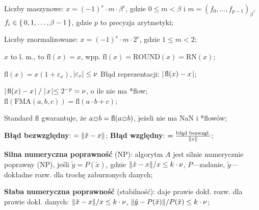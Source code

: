 
\entry
Liczby maszynowe: $x=(-1)^s \cdot m \cdot \beta^e$, gdzie $0\leq m < \beta$ i $m=(f_0, \ldots, f_{p-1})_\beta$, $f_i\in\set{0,1,\ldots,\beta-1}$, gdzie $p$ to precyzja arytmetyki;

\entry
Liczby znormalizowane: $x=(-1)^s\cdot m \cdot 2^e$, gdzie $1\leq m < 2$;

\entry
$x$ to l. m.,
to $\mathrm{fl}(x)=x$,
wpp. $\mathrm{fl}(x)=\mathrm{ROUND}(x)=\mathrm{RN}(x)$;

\entry
$\mathrm{fl}(x) = x(1+\varepsilon_x)$, $\abs{\varepsilon_x}\leq \nu$
\entry
Błąd reprezentacji: $\mid\! \mathrm{fl}(x) - x\! \mid$;

\entry
$\mid\! \mathrm{fl}(x) - x\! \mid / \mid\! x\! \mid\leq 2^{-p}=\nu$, o ile nie ma *flow;
\entry
$\mathrm{fl}(\mathrm{FMA}(a,b,c)) = \mathrm{fl}(a \cdot b + c)$;

\entry
Standard fl gwarantuje, że $a\, \Hsquare\, b = \mathrm{fl}(a \,\Hsquare\, b)$, jeżeli nie ma NaN i *flowów;


\entry
\textbf{Błąd bezwzględny}:
$=\|\tilde{x} - x\|$;
\entry
\textbf{Błąd względny}:
$=\frac{\text{błąd bezwzgl.}}{\|x\|}$;

\entry
\textbf{Silna numeryczna poprawność} (NP):
algorytm $A$ jest silnie numerycznie poprawny (NP),
jeśli $\tilde{y} = P(\tilde{x})$,
gdzie $\|\tilde{x}-x\| / x\leq k\cdot\nu$,
$P$---zadanie,
$\tilde{y}$---dokładne rozw. dla trochę zaburzonych danych;

\entry
\textbf{Słaba numeryczna poprawność} (stabilność):
daje prawie dokł. rozw. dla prawie dokł. danych:
$\|\tilde{x}-x\| / x\leq k\cdot\nu$, $\|\tilde{y}-P(\tilde{x})\| / P(\tilde{x})\leq k\cdot\nu$;
